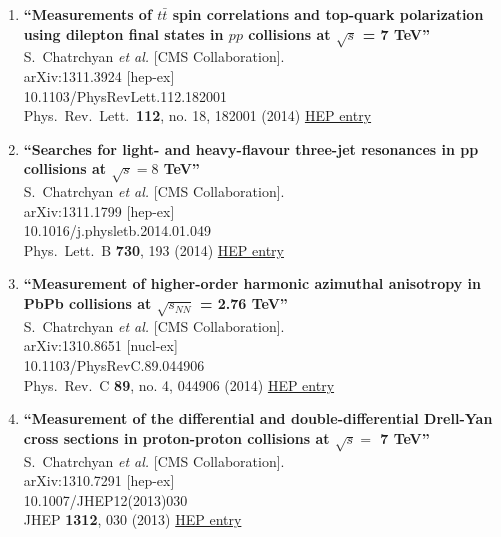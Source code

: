 \documentclass{article}
\begin{document}
\begin{enumerate}
\item%
{\bf ``Measurements of $t\bar{t}$ spin correlations and top-quark polarization using dilepton final states in $pp$ collisions at $\sqrt{s}$ = 7 TeV''}
  \\{}S.~Chatrchyan {\it et al.} [CMS Collaboration].
  \\{}arXiv:1311.3924 [hep-ex]
    \\{}10.1103/PhysRevLett.112.182001
\\{}Phys.\ Rev.\ Lett.\  {\bf 112}, no. 18, 182001 (2014) %
\href{http://inspirehep.net/record/1264662}{HEP entry}


\item%
{\bf ``Searches for light- and heavy-flavour three-jet resonances in pp collisions at $\sqrt{s} = 8$ TeV''}
  \\{}S.~Chatrchyan {\it et al.} [CMS Collaboration].
  \\{}arXiv:1311.1799 [hep-ex]
    \\{}10.1016/j.physletb.2014.01.049
\\{}Phys.\ Lett.\ B {\bf 730}, 193 (2014) %
\href{http://inspirehep.net/record/1263658}{HEP entry}


\item%
{\bf ``Measurement of higher-order harmonic azimuthal anisotropy in PbPb collisions at $\sqrt{s_{NN}}$ = 2.76 TeV''}
  \\{}S.~Chatrchyan {\it et al.} [CMS Collaboration].
  \\{}arXiv:1310.8651 [nucl-ex]
    \\{}10.1103/PhysRevC.89.044906
\\{}Phys.\ Rev.\ C {\bf 89}, no. 4, 044906 (2014) %
\href{http://inspirehep.net/record/1262804}{HEP entry}


\item%
{\bf ``Measurement of the differential and double-differential Drell-Yan cross sections in proton-proton collisions at $\sqrt{s} =$ 7 TeV''}
  \\{}S.~Chatrchyan {\it et al.} [CMS Collaboration].
  \\{}arXiv:1310.7291 [hep-ex]
    \\{}10.1007/JHEP12(2013)030
\\{}JHEP {\bf 1312}, 030 (2013) %
\href{http://inspirehep.net/record/1262319}{HEP entry}



\end{enumerate}
\end{document}
